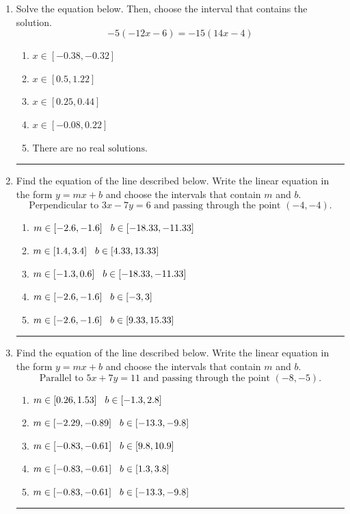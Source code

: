 \documentclass[14pt]{extbook}
\newcommand{\litem}[1]{\item#1\hspace*{-1cm}\rule{\textwidth}{0.4pt}}
\begin{document}
\begin{enumerate}
\litem{
Solve the equation below. Then, choose the interval that contains the solution.\[ -5(-12x -6) = -15(14x -4) \]\begin{enumerate}[label=\Alph*.]
\item \( x \in [-0.38, -0.32] \)
\item \( x \in [0.5, 1.22] \)
\item \( x \in [0.25, 0.44] \)
\item \( x \in [-0.08, 0.22] \)
\item \( \text{There are no real solutions.} \)

\end{enumerate} }
\litem{
Find the equation of the line described below. Write the linear equation in the form $ y=mx+b $ and choose the intervals that contain $m$ and $b$.\[ \text{Perpendicular to } 3 x - 7 y = 6 \text{ and passing through the point } (-4, -4). \]\begin{enumerate}[label=\Alph*.]
\item \( m \in [-2.6, -1.6] \hspace*{3mm} b \in [-18.33, -11.33] \)
\item \( m \in [1.4, 3.4] \hspace*{3mm} b \in [4.33, 13.33] \)
\item \( m \in [-1.3, 0.6] \hspace*{3mm} b \in [-18.33, -11.33] \)
\item \( m \in [-2.6, -1.6] \hspace*{3mm} b \in [-3, 3] \)
\item \( m \in [-2.6, -1.6] \hspace*{3mm} b \in [9.33, 15.33] \)

\end{enumerate} }
\litem{
Find the equation of the line described below. Write the linear equation in the form $ y=mx+b $ and choose the intervals that contain $m$ and $b$.\[ \text{Parallel to } 5 x + 7 y = 11 \text{ and passing through the point } (-8, -5). \]\begin{enumerate}[label=\Alph*.]
\item \( m \in [0.26, 1.53] \hspace*{3mm} b \in [-1.3, 2.8] \)
\item \( m \in [-2.29, -0.89] \hspace*{3mm} b \in [-13.3, -9.8] \)
\item \( m \in [-0.83, -0.61] \hspace*{3mm} b \in [9.8, 10.9] \)
\item \( m \in [-0.83, -0.61] \hspace*{3mm} b \in [1.3, 3.8] \)
\item \( m \in [-0.83, -0.61] \hspace*{3mm} b \in [-13.3, -9.8] \)


\end{enumerate}}
\end{enumerate}
\end{document}
